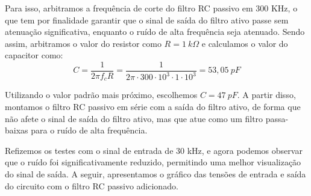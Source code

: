 Para isso, arbitramos a frequência de corte do filtro RC passivo em 300 KHz, o que tem por finalidade garantir que o sinal de saída do filtro ativo passe sem atenuação significativa, enquanto o ruído de alta frequência seja atenuado. Sendo assim, arbitramos o valor do resistor como $R = 1~k\Omega$ e calculamos o valor do capacitor como:
\begin{equation}
    C = \frac{1}{2 \pi f_c R} = \frac{1}{2 \pi \cdot 300 \cdot 10^3 \cdot 1 \cdot 10^3} = 53,05~pF
\end{equation}

Utilizando o valor padrão mais próximo, escolhemos $C = 47~pF$. A partir disso, montamos o filtro RC passivo em série com a saída do filtro ativo, de forma que não afete o sinal de saída do filtro ativo, mas que atue como um filtro passa-baixas para o ruído de alta frequência.

Refizemos os testes com o sinal de entrada de 30 kHz, e agora podemos observar que o ruído foi significativamente reduzido, permitindo uma melhor visualização do sinal de saída. A seguir, apresentamos o gráfico das tensões de entrada e saída do circuito com o filtro RC passivo adicionado.






